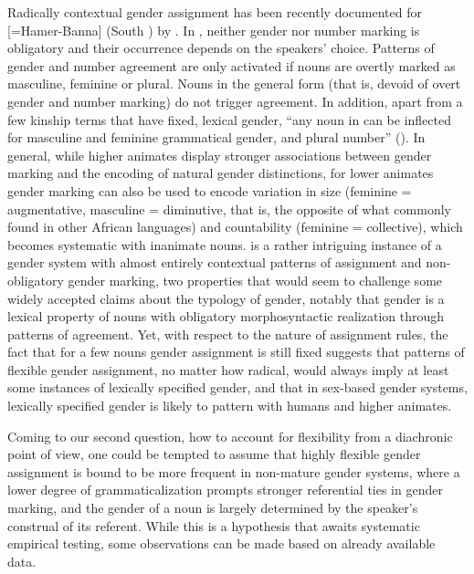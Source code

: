 \documentclass[output=collectionpaper]{langsci/langscibook}
\begin{document}
Radically contextual gender assignment has been recently documented for  [=Hamer-Banna] (South ) by \cite{Petrollino2016}. In , neither gender nor number marking is obligatory and their occurrence depends on the speakers' choice. Patterns of gender and number agreement are only activated if nouns are overtly marked as masculine, feminine or plural. Nouns in the general form (that is, devoid of overt gender and number marking) do not trigger agreement. In addition, apart from a few kinship terms that have fixed, lexical gender, ``any noun in  can be inflected for masculine and feminine grammatical gender, and plural number'' (\citealt[77]{Petrollino2016}). In general, while higher animates display stronger associations between gender marking and the encoding of natural gender distinctions, for lower animates gender marking can also be used to encode variation in size (feminine = augmentative, masculine = diminutive, that is, the opposite of what commonly found in other African languages) and countability (feminine = collective), which becomes systematic with inanimate nouns.  is a rather intriguing instance of a gender system with almost entirely contextual patterns of assignment and non-obligatory gender marking, two properties that would seem to challenge some widely accepted claims about the typology of gender, notably that gender is a lexical property of nouns with obligatory morphosyntactic realization through patterns of agreement. Yet, with respect to the nature of assignment rules, the fact that for a few nouns gender assignment is still fixed suggests that patterns of flexible gender assignment, no matter how radical, would always imply at least some instances of lexically specified gender, and that in sex-based gender systems, lexically specified gender is likely to pattern with humans and higher animates.

Coming to our second question, how to account for flexibility from a diachronic point of view, one could be tempted to assume that highly flexible gender assignment is bound to be more frequent in non-mature gender systems, where a lower degree of grammaticalization prompts stronger referential ties in gender marking, and the gender of a noun is largely determined by the speaker's construal of its referent. While this is a hypothesis that awaits systematic empirical testing, some observations can be made based on already available data.
\end{document}
